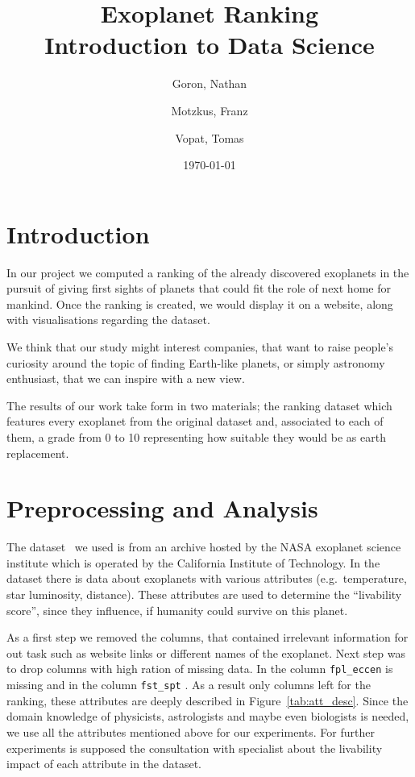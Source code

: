 \documentclass[12p]{article}
\title{Exoplanet Ranking \\\large Introduction to Data Science}
\date{\today}
\author{Goron, Nathan\and Motzkus, Franz\and Vopat, Tomas
}
\begin{document}
\maketitle

\section{Introduction}

In our project we computed a ranking of the already discovered exoplanets in the pursuit of giving first sights of planets that could fit the role of next home for mankind.
Once the ranking is created, we would display it on a website, along with visualisations regarding the dataset.

We think that our study might interest companies, that want to raise people's curiosity around the topic of finding Earth-like planets, or simply astronomy enthusiast, that we can inspire with a new view.

The results of our work take form in two materials; the ranking dataset which features every exoplanet from the original dataset and, associated to each of them, a grade from 0 to 10 representing how suitable they would be as earth replacement.


\section{Preprocessing and Analysis}
The dataset~\cite{dataset} we used is from an archive hosted by the NASA exoplanet science institute which is operated by the California Institute of Technology. In the dataset there is data about  exoplanets with  various attributes (e.g.\ temperature, star luminosity, distance). These attributes are used to determine the ``livability score'', since they influence, if humanity could survive on this planet.

As a first step we removed the columns, that contained irrelevant information for out task such as website links or different names of the exoplanet. Next step was to drop columns with high ration of missing data. In the column \verb|fpl_eccen| is  missing and in the column \verb|fst_spt| . As a result only  columns left for the ranking, these attributes are deeply described in Figure~\ref{tab:att_desc}. Since the domain knowledge of physicists, astrologists and maybe even biologists is needed, we use all the attributes mentioned above for our experiments. For further experiments is supposed the consultation with specialist about the livability impact of each attribute in the dataset.
\end{document}
